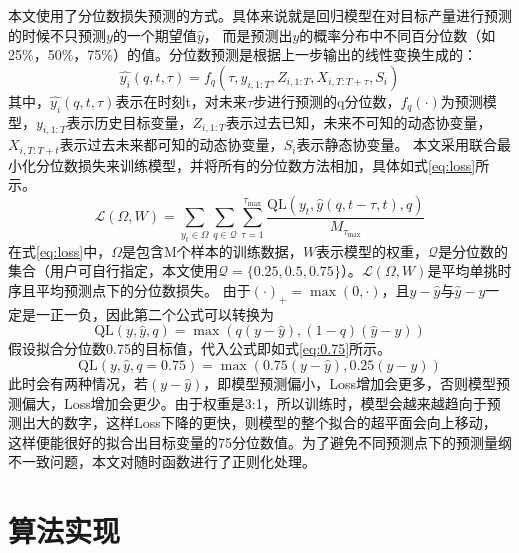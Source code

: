本文使用了分位数损失预测的方式。具体来说就是回归模型在对目标产量进行预测的时候不只预测$y$的一个期望值$\hat{y}$，
而是预测出$y$的概率分布中不同百分位数（如25\%，50\%，75\%）的值。分位数预测是根据上一步输出的线性变换生成的：
\begin{equation}
    \hat{{y_i}}(q, t, \tau) = f_q (\tau, y_{i,1:T}, Z_{i,1:T}, X_{i,T:T+\tau}, S_i)
\end{equation}
其中，$\hat{{y_i}}(q, t, \tau)$表示在时刻t，对未来$\tau$步进行预测的q分位数，$f_q(\cdot)$为预测模型，$ y_{i,1:T}$表示历史目标变量，$Z_{i,1:T}$表示过去已知，未来不可知的动态协变量，$X_{i,T:T+t}$表示过去未来都可知的动态协变量，$S_i$表示静态协变量。
本文采用联合最小化分位数损失来训练模型，并将所有的分位数方法相加，具体如式\eqref{eq:loss}所示。
\begin{equation}
    \mathcal{L}(\Omega, {W}) = \sum_{y_t \in \Omega} \sum_{q \in \mathcal{Q} } \sum_{\tau=1}^{\tau_{\max}} \frac{\text{QL}(y_t, \hat{{y}}(q, t - \tau, t), q)}{M_{\tau_{\max}}}
    \label{eq:loss}
\end{equation}
在式\eqref{eq:loss}中，$\Omega$是包含M个样本的训练数据，$W$表示模型的权重，$\mathcal{Q}$是分位数的集合（用户可自行指定，本文使用$\mathcal{Q} = \{0.25,0.5,0.75\}$）。$\mathcal{L}(\Omega, {W})$是平均单挑时序且平均预测点下的分位数损失。
由于$(\cdot)_+ = \max(0, \cdot)$，且$y-\hat{y}$与$\hat{y}-y$一定是一正一负，因此第二个公式可以转换为
\begin{equation}
    \text{QL}(y, \hat{y}, q) =  \max(q(y - \hat{y} ), (1 - q)(\hat{y} - y))
\end{equation}
假设拟合分位数0.75的目标值，代入公式即如式\eqref{eq:0.75}所示。
\begin{equation}
    \text{QL}(y, \hat{y}, q=0.75) =  \max(0.75(y - \hat{y} ), 0.25(\hat{y} - y))
    \label{eq:0.75}
\end{equation}
此时会有两种情况，若$(y - \hat{y} )$，即模型预测偏小，Loss增加会更多，否则模型预测偏大，Loss增加会更少。由于权重是3:1，所以训练时，模型会越来越趋向于预测出大的数字，这样Loss下降的更快，则模型的整个拟合的超平面会向上移动，
这样便能很好的拟合出目标变量的75分位数值。为了避免不同预测点下的预测量纲不一致问题，本文对随时函数进行了正则化处理。
\section{算法实现}
